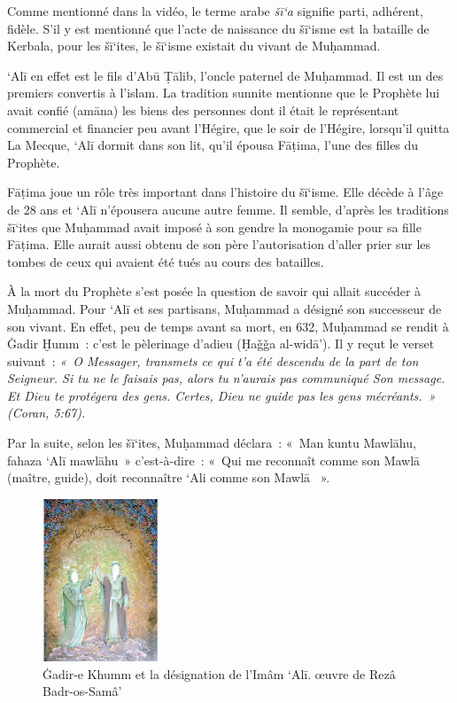 
Comme mentionné dans la vidéo, le terme arabe \emph{šī`a} signifie
parti, adhérent, fidèle. S'il y est mentionné que l'acte de naissance du
šī`isme est la bataille de Kerbala, pour les šī`ites, le šī`isme
existait du vivant de Muḥammad.

`Alī en effet est le fils d'Abū Ṭālib, l'oncle paternel de Muḥammad. Il
est un des premiers convertis à l'islam. La tradition sunnite mentionne
que le Prophète lui avait confié (amāna) les biens des personnes dont il
était le représentant commercial et financier peu avant l'Hégire, que le
soir de l'Hégire, lorsqu'il quitta La Mecque, `Alī dormit dans son lit,
qu'il épousa Fāṭima, l'une des filles du Prophète.

Fāṭima joue un rôle très important dans l'histoire du šī`isme. Elle
décède à l'âge de 28 ans et `Alī n'épousera aucune autre femme. Il
semble, d'après les traditions šī`ites que Muḥammad avait imposé à son
gendre la monogamie pour sa fille Fāṭima. Elle aurait aussi obtenu de
son père l'autorisation d'aller prier sur les tombes de ceux qui avaient
été tués au cours des batailles.

À la mort du Prophète s'est posée la question de savoir qui allait
succéder à Muḥammad. Pour `Alī et ses partisans, Muḥammad a désigné son
successeur de son vivant. En effet, peu de temps avant sa mort, en 632,
Muḥammad se rendit à Ġadir Ḫumm~: c'est le pèlerinage d'adieu (Ḥaǧǧa
al-widā'). Il y reçut le verset suivant~: \emph{«~O Messager, transmets
ce qui t'a été descendu de la part de ton Seigneur. Si tu ne le faisais
pas, alors tu n'aurais pas communiqué Son message. Et Dieu te protégera
des gens. Certes, Dieu ne guide pas les gens mécréants.~» (Coran,
5:67).}

Par la suite, selon les šī`ites, Muḥammad déclara~: «~Man kuntu Mawlāhu,
fahaza `Alī mawlāhu~» c'est-à-dire~: «~Qui me reconnaît comme son Mawlā
(maître, guide), doit reconnaître `Ali comme son Mawlā ~».

\begin{figure}
    \centering
    \includegraphics[width=1.35188in,height=1.90972in]{Images/image078.png}
    \caption{Ġadir-e Khumm et la
désignation de l'Imâm `Alī. œuvre de Rezâ
Badr-os-Samâ'}
    \label{Ġadir-e Khumm}
\end{figure}


